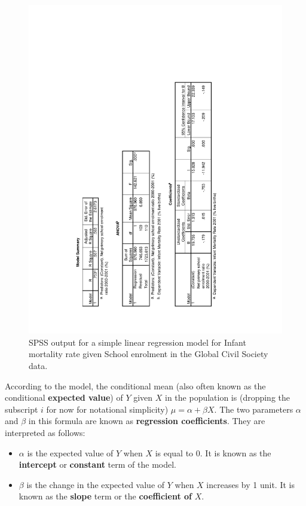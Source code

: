 \documentclass[11pt,a4paper,openany]{book}
\begin{document}
\begin{figure}[htbp]
\centering
\includegraphics[width=15.50000cm]{spsslinreg.pdf}
\caption{\label{fig:f-spss-linreg} SPSS output for a simple linear
regression model for Infant mortality rate given School enrolment in the
Global Civil Society data.}
\end{figure}

According to the model, the conditional mean (also often known as the
conditional \textbf{expected value}) of \(Y\) given \(X\) in the
population is (dropping the subscript \(i\) for now for notational
simplicity) \(\mu=\alpha+\beta X\). The two parameters \(\alpha\) and
\(\beta\) in this formula are known as \textbf{regression coefficients}.
They are interpreted as follows:

\begin{itemize}
\item
  \(\alpha\) is the expected value of \(Y\) when \(X\) is equal to 0. It
  is known as the \textbf{intercept} or \textbf{constant} term of the
  model.
\item
  \(\beta\) is the change in the expected value of \(Y\) when \(X\)
  increases by 1 unit. It is known as the \textbf{slope} term or the
  \textbf{coefficient of} \(X\).
\end{itemize}
\end{document}
